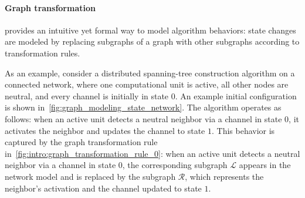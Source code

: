 \paragraph{Graph transformation} provides an intuitive yet formal way to model algorithm behaviors: state changes are modeled by replacing subgraphs of a graph with other subgraphs according to transformation rules.

As an example, consider a distributed spanning-tree construction algorithm on a connected network, where one computational unit is active, all other nodes are neutral, and every channel is initially in state $0$. An example initial configuration is shown in~\autoref{fig:graph_modeling_state_network}. 
The algorithm operates as follows: when an active unit detects a neutral neighbor via a channel in state $0$, it activates the neighbor and updates the channel to state $1$.
 This behavior is captured by the graph transformation rule in~\autoref{fig:intro:graph_transformation_rule_0}: when an active unit detects a neutral neighbor via a channel in state $0$, the corresponding subgraph \(\mathcal{L}\) appears in the network model and is replaced by the subgraph \(\mathcal{R}\), which represents the neighbor's activation and the channel updated to state $1$.
 \begin{figure}[H]
        \centering 
        \caption{}  
        \label{fig:intro:graph_transformation_rule_0}
    \end{figure}

